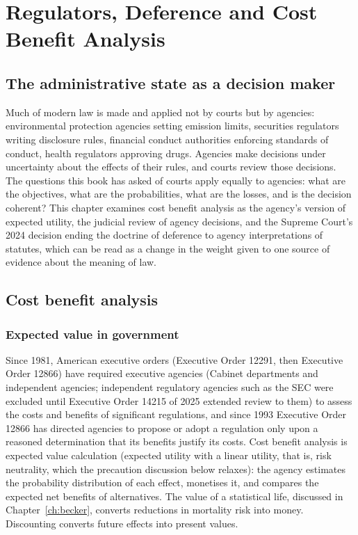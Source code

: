 \chapter{Regulators, Deference and Cost Benefit Analysis}
\label{ch:regulation}

\section{The administrative state as a decision maker}

Much of modern law is made and applied not by courts but by agencies: environmental protection agencies setting emission limits, securities regulators writing disclosure rules, financial conduct authorities enforcing standards of conduct, health regulators approving drugs. Agencies make decisions under uncertainty about the effects of their rules, and courts review those decisions. The questions this book has asked of courts apply equally to agencies: what are the objectives, what are the probabilities, what are the losses, and is the decision coherent? This chapter examines cost benefit analysis as the agency's version of expected utility, the judicial review of agency decisions, and the Supreme Court's 2024 decision ending the doctrine of deference to agency interpretations of statutes, which can be read as a change in the weight given to one source of evidence about the meaning of law.

\section{Cost benefit analysis}

\subsection{Expected value in government}

Since 1981, American executive orders (Executive Order 12291, then Executive Order 12866) have required executive agencies (Cabinet departments and independent agencies; independent regulatory agencies such as the SEC were excluded until Executive Order 14215 of 2025 extended review to them) to assess the costs and benefits of significant regulations, and since 1993 Executive Order 12866 has directed agencies to propose or adopt a regulation only upon a reasoned determination that its benefits justify its costs. Cost benefit analysis is expected value calculation (expected utility with a linear utility, that is, risk neutrality, which the precaution discussion below relaxes): the agency estimates the probability distribution of each effect, monetises it, and compares the expected net benefits of alternatives. The value of a statistical life, discussed in Chapter~\ref{ch:becker}, converts reductions in mortality risk into money. Discounting converts future effects into present values.

